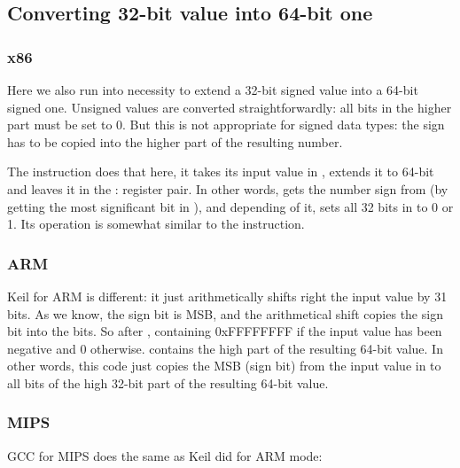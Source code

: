 ﻿\subsection{Converting 32-bit value into 64-bit one}
\label{subsec:sign_extending_32_to_64}



\subsubsection{x86}



Here we also run into necessity to extend a 32-bit signed value into a 64-bit signed one.
Unsigned values are converted straightforwardly: all bits in the higher part must be set to 0.
But this is not appropriate for signed data types: the sign has to be copied into the higher part of the resulting number.

The  instruction does that here, it takes its input value in \EAX{}, extends it to 64-bit and leaves it
in the \EDX{}:\EAX{} register pair.
In other words,  gets the number sign from \EAX{} (by getting the
most significant bit in \EAX{}), and depending of it, sets all 32 bits in \EDX{} to 0 or 1.
Its operation is somewhat
similar to the \MOVSX{} instruction.

\subsubsection{ARM}



Keil for ARM is different: it just arithmetically shifts right the input value by 31 bits.
As we know, the sign bit is \ac{MSB}, and the arithmetical shift copies the sign bit into the  bits.
So after ,  containing 0xFFFFFFFF if the input value has been negative and 0 otherwise.
 contains the high part of the resulting 64-bit value.
In other words, this code just copies the \ac{MSB} (sign bit) from the input value in  to all bits of the high 32-bit part of the resulting 64-bit value.

\subsubsection{MIPS}

GCC for MIPS does the same as Keil did for ARM mode:


